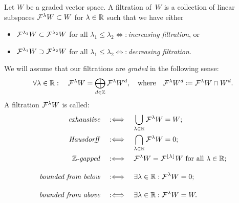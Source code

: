\documentclass[\MainFolder/Text.tex]{subfiles}
\begin{document}
\begin{Definition}[Filtrations] \label{Def:Filtrations}
Let $W$ be a graded vector space. A filtration of~$W$ is a collection of linear subspaces $\mathcal{F}^\lambda W \subset W$ for $\lambda\in \mathbb{R}$ such that we have either
\begin{itemize}
\item $\mathcal{F}^{\lambda_1}W\subset \mathcal{F}^{\lambda_2}W$ for all $\lambda_1 \le \lambda_2$\quad$\Longleftrightarrow:$\quad\emph{increasing filtration}, or
\item  $\mathcal{F}^{\lambda_1}W\supset \mathcal{F}^{\lambda_2}W$ for all $\lambda_1 \le \lambda_2$\quad$\Longleftrightarrow:$\quad\emph{decreasing filtration.}
\end{itemize}
We will assume that our filtrations are \emph{graded} in the following sense:
\[ \forall \lambda\in \mathbb{R}:\quad \mathcal{F}^\lambda W = \bigoplus_{d\in \mathbb{Z}} \mathcal{F}^\lambda W^d,\quad \text{where}\quad\mathcal{F}^\lambda W^d \coloneqq \mathcal{F}^\lambda W \cap W^d.\]
A filtration $\mathcal{F}^\lambda W$ is called:
\begin{align*}
 \text{\emph{exhaustive}}&\quad:\Longleftrightarrow\quad\bigcup_{\lambda\in \mathbb{R}} \mathcal{F}^\lambda W = W;\\
 \text{\emph{Hausdorff}} &\quad:\Longleftrightarrow\quad\bigcap_{\lambda\in \mathbb{R}} \mathcal{F}^\lambda W = 0;\\
 \text{\emph{$\mathbb{Z}$-gapped}} &\quad:\Longleftrightarrow\quad\mathcal{F}^\lambda W = \mathcal{F}^{\lfloor\lambda\rfloor} W\text{ for all }\lambda \in \mathbb{R};\\[3\jot]
 \text{\emph{bounded from below}}&\quad:\Longleftrightarrow\quad\exists \lambda \in \mathbb{R}: \mathcal{F}^\lambda W =0;\\[3\jot]
 \text{\emph{bounded from above}}&\quad:\Longleftrightarrow\quad\exists \lambda\in \mathbb{R}: \mathcal{F}^\lambda W =W.
\end{align*} 


\end{Definition}
\end{document}
